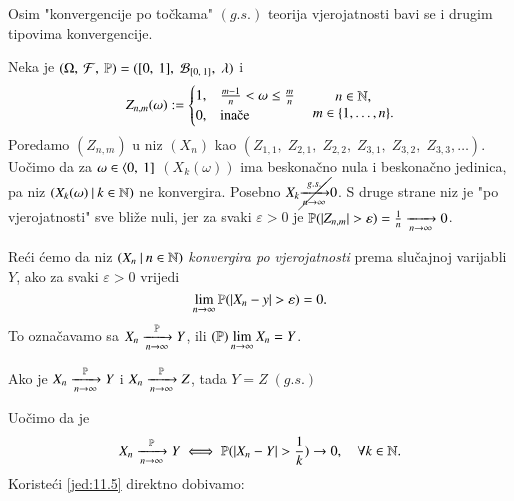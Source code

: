 Osim "konvergencije po to\v ckama" $(g.s.)$ teorija vjerojatnosti bavi se i drugim tipovima konvergencije.

\begin{pr}  \label{pr:11.13}
    Neka je $(\Omega, \: \mathcal{F}, \: \mathbb{P}) = ([{0}, \:{1}], \; \mathcal{B}_{[{0}, \:{1}]}, \; \lambda)$ i
    \begin{equation*}
        Z_{n, m} (\omega) :=
        \begin{cases}
            1, &\frac{m-1}{n} < \omega \leq \frac{m}{n}\\
            0, &\textnormal{ina\v ce}
        \end{cases}
        \quad
        \begin{matrix}
            n \in \nat,\\
            m \in \{ 1, \ldots, n \}.
        \end{matrix}
    \end{equation*}
    Poredamo $(Z_{n, m})$ u niz $(X_n)$ kao $(Z_{1,1}, \; Z_{2,1}, \; Z_{2, 2}, \; Z_{3,1}, \; Z_{3,2}, \; Z_{3,3}, \ldots)$.
    Uo\v cimo da za $\omega \in \langle {0}, \: {1}]$ $(X_k (\omega))$ ima beskona\v cno nula i beskona\v cno jedinica, pa niz $({X_k (\omega)} \: | \: {k \in \mathbb{N}})$ ne konvergira.
    Posebno $X_k \cancel{\xrightarrow[n \to \infty]{g.s.}} 0$.
    S druge strane niz je "po vjerojatnosti" sve bli\v ze nuli, jer za svaki $\varepsilon > 0$ je $\mathbb{P}({|Z_{n, m}| > \varepsilon}) = \frac{1}{n} \xrightarrow[n \to \infty]{} 0$. 
\end{pr}

\begin{defn}    \label{defn:11.13-1}
    Re\' ci \' cemo da niz $({X_n} \: | \: {n \in \mathbb{N}})$ \emph{konvergira po vjerojatnosti} prema slu\v cajnoj varijabli $Y$, ako za svaki $\varepsilon > 0$ vrijedi
    \begin{equation*}
        \lim\limits_{n \to \infty} \mathbb{P}({|X_n - y| > \varepsilon}) = 0.
    \end{equation*}
    To ozna\v cavamo sa $X_n \xrightarrow[n \to \infty]{\mathbb{P}} Y$, ili $(\mathbb{P}) \lim\limits_{n \to \infty} X_n = Y$. 
\end{defn}

\begin{zad} \label{zad:11.14}
    Ako je $X_n \xrightarrow[n \to \infty]{\mathbb{P}} Y$ i $X_n \xrightarrow[n \to \infty]{\mathbb{P}} Z$, tada $Y =  Z \; (g.s.)$
\end{zad}

Uo\v cimo da je
\begin{equation}    \label{jed:11.15}
    X_n \xrightarrow[n \to \infty]{\mathbb{P}} Y \iff \mathbb{P}({|X_n - Y| > \frac{1}{k}}) \to 0, \quad \forall k \in \mathbb{N}.
\end{equation}
Koriste\' ci \eqref{jed:11.5} direktno dobivamo:

